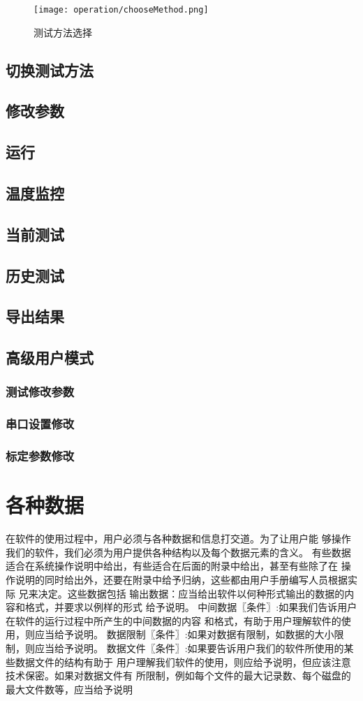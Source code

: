 \begin{figure}[htbp]
    \centering
    \texttt{[image: operation/chooseMethod.png]}
    \caption{ 测试方法选择 \label{fig:chooseMethod}}
\end{figure}
\subsection{切换测试方法}
\subsection{修改参数}
\subsection{运行}
\subsection{温度监控}
\subsection{当前测试}
\subsection{历史测试}
\subsection{导出结果}
\subsection{高级用户模式\label{subsec:advancedUser}}
\subsubsection*{测试修改参数}
\subsubsection*{串口设置修改}
\subsubsection*{标定参数修改}
\section{各种数据}在软件的使用过程中，用户必须与各种数据和信息打交道。为了让用户能
够操作我们的软件，我们必须为用户提供各种结构以及每个数据元素的含义。
有些数据适合在系统操作说明中给出，有些适合在后面的附录中给出，甚至有些除了在
操作说明的同时给出外，还要在附录中给予归纳，这些都由用户手册编写人员根据实际
兄来决定。这些数据包括
输出数据：应当给出软件以何种形式输出的数据的内容和格式，并要求以例样的形式
给予说明。
中间数据〖条件〗:如果我们告诉用户在软件的运行过程中所产生的中间数据的内容
和格式，有助于用户理解软件的使用，则应当给予说明。
数据限制〖条件〗:如果对数据有限制，如数据的大小限制，则应当给予说明。
数据文件〖条件〗:如果要告诉用户我们的软件所使用的某些数据文件的结构有助于
用户理解我们软件的使用，则应给予说明，但应该注意技术保密。如果对数据文件有
所限制，例如每个文件的最大记录数、每个磁盘的最大文件数等，应当给予说明
